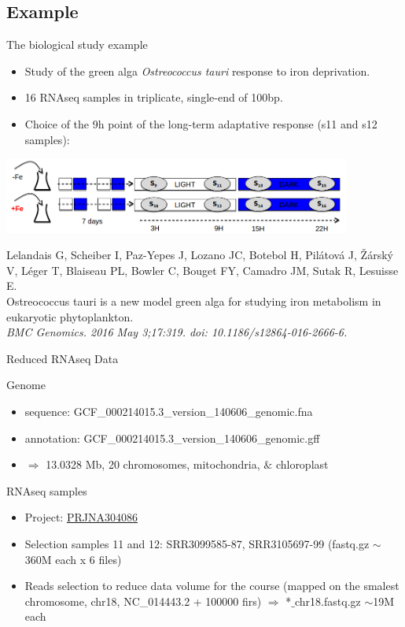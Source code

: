 \subsection*{Example}
\begin{frame}{The biological study example}
\begin{itemize}
    \item Study of the green alga {\it Ostreococcus tauri} response to iron deprivation. 
    \item 16 RNAseq samples in triplicate, single-end of 100bp.
    \item Choice of the 9h point of the long-term adaptative response (s11 and s12 samples):
\end{itemize}
\begin{center}
   \includegraphics[height=2.5cm]{01_introduction/images/OTauri_Fe_longTerm.png}
\end{center}

\tiny{
Lelandais G, Scheiber I, Paz-Yepes J, Lozano JC, Botebol H, Pilátová J, Žárský V, Léger T, Blaiseau PL, Bowler C, Bouget FY, Camadro JM, Sutak R, Lesuisse E.\\
Ostreococcus tauri is a new model green alga for studying iron metabolism in eukaryotic phytoplankton.\\
\it{BMC Genomics}. 2016 May 3;17:319. doi: 10.1186/s12864-016-2666-6.}
\end{frame}
\begin{frame}{Reduced RNAseq Data}
\begin{block}{Genome}
    \begin{itemize}
        \item sequence: GCF\_000214015.3\_version\_140606\_genomic.fna
        \item annotation: GCF\_000214015.3\_version\_140606\_genomic.gff
        \item $\Rightarrow$ 13.0328 Mb, 20 chromosomes, mitochondria, $\&$ chloroplast
    \end{itemize}
\end{block}
\begin{block}{RNAseq samples}
    \begin{itemize}
      \item Project: \href{https://www.ebi.ac.uk/ena/browser/view/PRJNA304086}{PRJNA304086}
      \item Selection samples 11 and 12: SRR3099585-87, SRR3105697-99 (fastq.gz ${\sim}$360M each x 6 files)
      \item Reads selection to reduce data volume for the course (mapped on the smalest chromosome, chr18, NC\_014443.2 + 100000 firs) $\Rightarrow$ *$\_$chr18.fastq.gz ${\sim}$19M each
    \end{itemize}
\end{block}
\end{frame}
